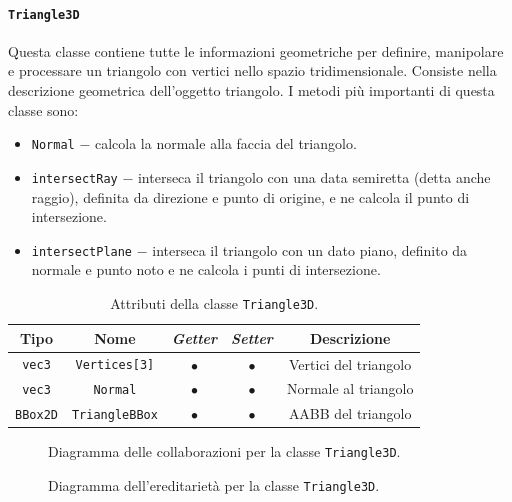 \paragraph{\texttt{Triangle3D}}
Questa classe contiene tutte le informazioni geometriche per definire, manipolare e processare un triangolo con vertici nello spazio tridimensionale. Consiste nella descrizione geometrica dell'oggetto triangolo. I metodi più importanti di questa classe sono:
\begin{itemize}
	\item \texttt{Normal} $-$ calcola la normale alla faccia del triangolo.
	\item \texttt{intersectRay} $-$ interseca il triangolo con una data semiretta (detta anche raggio), definita da direzione e punto di origine, e ne calcola il punto di intersezione.
	\item \texttt{intersectPlane} $-$ interseca il triangolo con un dato piano, definito da normale e punto noto e ne calcola i punti di intersezione.
\end{itemize}
\begin{table}[h!]
	\centering
	\begin{tabular}{|c|c|c|c|c|}
		\hline 
		\textbf{Tipo} & \textbf{Nome} & \textit{\textbf{Getter}} & \textit{\textbf{Setter}} & \textbf{Descrizione} \\ \hline 
		\texttt{vec3} & \texttt{Vertices[3]} & $\bullet$ & $\bullet$ & Vertici del triangolo \\ \hline 
		\texttt{vec3} & \texttt{Normal} & $\bullet$ & $\bullet$ & Normale al triangolo \\ \hline 
		\texttt{BBox2D} & \texttt{TriangleBBox} & $\bullet$ & $\bullet$ & \ac{AABB} del triangolo \\ \hline
	\end{tabular}
	\caption{Attributi della classe \texttt{Triangle3D}.}
\end{table}
%
\begin{figure}[h!]
	\centering
	\caption{Diagramma delle collaborazioni per la classe \texttt{Triangle3D}.}
\end{figure}
\begin{figure}[h!]
	\centering
	\caption{Diagramma dell'ereditarietà per la classe \texttt{Triangle3D}.}
\end{figure}
%
